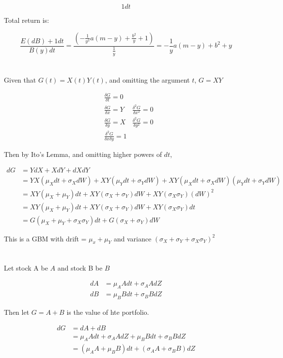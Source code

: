 \documentclass[11pt]{scrartcl}
\renewcommand{\dfrac}[2]{\ensuremath{\frac{\delta #1}{\delta #2}}}
\newcommand{\ddfrac}[2]{\ensuremath{\frac{\delta^2 #1}{\delta #2^2}}}
\newcommand{\dddfrac}[3]{\ensuremath{\frac{\delta^2 #1}{\delta #2 \delta #3}}}
\begin{document}
\[1dt\]

Total return is:

\[ \frac{E(dB) + 1dt}{B(y)dt} = \frac{\left(-\frac{1}{y^2}a(m-y) + \frac{b^2}{y} + 1\right)}{\frac{1}{y}} = -\frac{1}{y}a(m-y) + b^2 + y \]

\section{}

Given that $G(t) = X(t)Y(t)$, and omitting the argument $t$, $G=XY$

\begin{align*}
&\dfrac{G}{t} = 0 &\\
&\dfrac{G}{x} = Y &\ddfrac{G}{x} = 0 \\
&\dfrac{G}{y} = X &\ddfrac{G}{y} = 0 \\
&\dddfrac{G}{x}{y} = 1
\end{align*}

Then by Ito's Lemma, and omitting higher powers of $dt$, 

\begin{align*}
dG &= YdX + XdY + dXdY \\
&= YX(\mu_X dt + \sigma_XdW) + XY(\mu_Y dt + \sigma_YdW) + XY(\mu_Xdt +\sigma_XdW)(\mu_Ydt + \sigma_YdW) \\
&= XY(\mu_X + \mu_Y)dt + XY(\sigma_X + \sigma_Y)dW + XY(\sigma_X\sigma_Y)(dW)^2 \\
&= XY(\mu_X + \mu_Y)dt + XY(\sigma_X + \sigma_Y)dW + XY(\sigma_X\sigma_Y)dt \\
&= G(\mu_X + \mu_Y + \sigma_X\sigma_Y)dt + G(\sigma_X + \sigma_Y)dW
\end{align*}

This is a GBM with drift = $\mu_x + \mu_Y$ and variance $(\sigma_X + \sigma_Y + \sigma_X\sigma_Y)^2$

\section{}

Let stock A be $A$ and stock B be $B$

\begin{align*}
dA &= \mu_A Adt + \sigma_A A dZ \\
dB &= \mu_B Bdt + \sigma_B B dZ
\end{align*}

Then let $G = A+B$ is the value of hte portfolio.

\begin{align*}
dG &= dA + dB \\
&= \mu_A Adt + \sigma_A A dZ + \mu_B Bdt + \sigma_B B dZ \\
&= (\mu_A A + \mu_B B) dt + (\sigma_A A + \sigma_B B) dZ
\end{align*}
\end{document}
